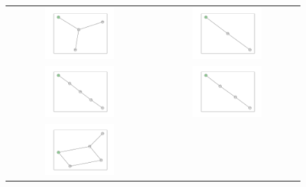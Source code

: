 \documentclass[12pt, a4paper]{extarticle}
\begin{document}
\begin{figure}\centering\begin{tabularx}{\textwidth}{cc}
\includegraphics[width=0.5\textwidth]{task11-graphlets/4_16-25-23-26.pdf} &
\includegraphics[width=0.5\textwidth]{task11-graphlets/3_22-23-24.pdf} \\
\includegraphics[width=0.5\textwidth]{task11-graphlets/5_11-14-13-21-23.pdf} &
\includegraphics[width=0.5\textwidth]{task11-graphlets/4_16-17-25-23.pdf} \\
\includegraphics[width=0.5\textwidth]{task11-graphlets/5_21-18-20-22-23.pdf} &

\end{tabularx}
\end{figure}
\end{document}
